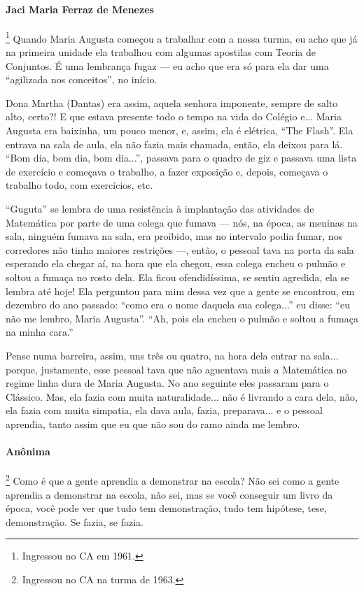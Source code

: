 \documentclass{hipatia}
\begin{document}
\paragraph{Jaci Maria Ferraz de Menezes}\footnote{Ingressou no CA em 1961.}
Quando Maria Augusta começou a trabalhar com a nossa turma, eu acho que
já na primeira unidade ela trabalhou com algumas apostilas com Teoria de
Conjuntos. É uma lembrança fugaz --- eu acho que era só para ela dar uma
``agilizada nos conceitos'', no início.

Dona Martha (Dantas) era assim, aquela senhora imponente, sempre de
salto alto, certo?! E que estava presente todo o tempo na vida do
Colégio e... Maria Augusta era baixinha, um pouco menor, e, assim, ela é
elétrica, ``The Flash''. Ela entrava na sala de aula, ela não fazia mais
chamada, então, ela deixou para lá. ``Bom dia, bom dia, bom dia...'',
passava para o quadro de giz e passava uma lista de exercício e começava
o trabalho, a fazer exposição e, depois, começava o trabalho todo, com
exercícios, etc.

``Guguta'' se lembra de uma resistência à implantação das atividades de
Matemática por parte de uma colega que fumava --- nós, na época, as
meninas na sala, ninguém fumava na sala, era proibido, mas no intervalo
podia fumar, nos corredores não tinha maiores restrições ---, então, o
pessoal tava na porta da sala esperando ela chegar aí, na hora que ela
chegou, essa colega encheu o pulmão e soltou a fumaça no rosto dela. Ela
ficou ofendidíssima, se sentiu agredida, ela se lembra até hoje! Ela
perguntou para mim dessa vez que a gente se encontrou, em dezembro do ano
passado: ``como era o nome daquela sua colega...'' eu disse: ``eu não me
lembro, Maria Augusta''. ``Ah, pois ela encheu o pulmão e soltou a
fumaça na minha cara.''

Pense numa barreira, assim, uns três ou quatro, na hora dela entrar na
sala... porque, justamente, esse pessoal tava que não aguentava mais a
Matemática no regime linha dura de Maria Augusta. No ano seguinte eles
passaram para o Clássico. Mas, ela fazia com muita naturalidade... não é
livrando a cara dela, não, ela fazia com muita simpatia, ela dava aula,
fazia, preparava... e o pessoal aprendia, tanto assim que eu que não sou
do ramo ainda me lembro.

\paragraph{Anônima}\footnote{Ingressou no CA na turma de 1963.}
Como é que a gente aprendia a demonstrar na escola? Não sei como a gente
aprendia a demonstrar na escola, não sei, mas se você conseguir um livro
da época, você pode ver que tudo tem demonstração, tudo tem hipótese,
tese, demonstração. Se fazia, se fazia.
\end{document}
